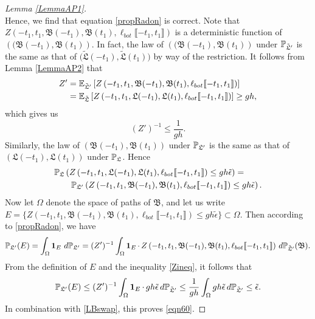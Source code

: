 \begin{proof}[Lemma \ref{LemmaAP1}]
\begin{equation*}
	\end{equation*}
	Hence, we find that equation \ref{propRadon} is correct.
	 Note that $Z\left(-t_1, t_1, \mathfrak B(-t_1), \mathfrak B(t_1), \ell_{bot}\llbracket -t_1, t_1\rrbracket\right)$ is a deterministic function of $\left((\mathfrak B(-t_1), \mathfrak B(t_1)\right)$. In fact, the law of $\left((\mathfrak B(-t_1), \mathfrak B(t_1)\right)$ under $\mathbb{P}_{\tilde{\mathfrak L}'}$ is the same as that of $\big(\tilde{\mathfrak L}(-t_1), \tilde{\mathfrak L}(t_1)\big)$ by way of the restriction. It follows from Lemma \ref{LemmaAP2} that
	\begin{align*}
	Z' &= \mathbb{E}_{\tilde{\mathfrak{L}}'}\left[Z\left(-t_1, t_1, \mathfrak B(-t_1), \mathfrak B(t_1), \ell_{bot}\llbracket -t_1, t_1\rrbracket\right)\right]\\
	&= \mathbb{E}_{\tilde{\mathfrak{L}}}\left[Z\left(-t_1, t_1, \mathfrak L(-t_1), \mathfrak L(t_1), \ell_{bot}\llbracket -t_1, t_1\rrbracket\right)\right]\geq gh,
	\end{align*}
	which gives us 
	\begin{equation}
	\label{Zineq} (Z')^{-1}\leq \frac{1}{gh}.
	\end{equation}
	Similarly,  the law of $\left(\mathfrak B(-t_1), \mathfrak{B}(t_1)\right)$ under $\mathbb{P}_{\mathfrak L'}$ is the same as that of $\left(\mathfrak L(-t_1), \mathfrak L(t_1)\right)$ under $\mathbb{P}_{\mathfrak L}$. Hence
	\begin{equation}\label{LBswap}
	\begin{split}
	&\mathbb{P}_{\mathfrak L}\left(Z\left(-t_1, t_1, \mathfrak L(-t_1), \mathfrak L(t_1), \ell_{bot}\llbracket -t_1, t_1\rrbracket\right)\leq gh\tilde \epsilon\right)=\\
	&\qquad\mathbb{P}_{\mathfrak L'}\left(Z\left(-t_1, t_1, \mathfrak B(-t_1), \mathfrak B(t_1), \ell_{bot}\llbracket -t_1, t_1\rrbracket\right)\leq gh\tilde \epsilon\right).
	\end{split}
	\end{equation}
	Now let $\Omega$ denote the space of paths of $\mathfrak B$, and let us write $E=\{Z\left(-t_1, t_1, \mathfrak B(-t_1), \mathfrak B(t_1), \ell_{bot}\llbracket -t_1, t_1\rrbracket\right)\leq gh\tilde\epsilon\}\subset \Omega$. Then according to \eqref{propRadon}, we have
	\[
	\mathbb{P}_{\mathfrak L'}(E)=\int_\Omega \operatorname{\mathbf{1}}_E\, d\mathbb{P}_{\mathfrak L'} = (Z')^{-1}\int_\Omega\operatorname{\mathbf{1}}_E \cdot\, Z\left(-t_1, t_1, \mathfrak B(-t_1), \mathfrak B(t_1), \ell_{bot}\llbracket -t_1, t_1\rrbracket\right)\, d\mathbb{P}_{\tilde{\mathfrak{L}}'}(\mathfrak{B}).
	\]
	From the definition of $E$ and the inequality \eqref{Zineq}, it follows that
	\[
	\mathbb{P}_{\mathfrak L'}(E)\leq (Z')^{-1}\int_\Omega \operatorname{\mathbf{1}}_E\cdot\, gh\tilde{\epsilon}\, d\mathbb{P}_{\tilde{\mathfrak{L}}'} \leq \frac{1}{gh}\int_\Omega gh\tilde\epsilon\, d\mathbb{P}_{\tilde{\mathfrak{L}}'}\leq \tilde{\epsilon}.
	\]
	In combination with \eqref{LBswap}, this proves \eqref{eqn60}.
	
\end{proof}

